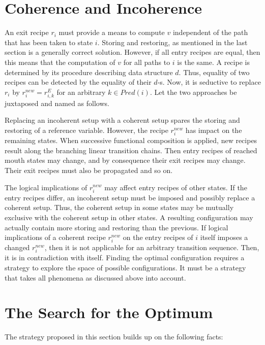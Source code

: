 \documentclass[12pt,a4paper]{scrartcl}
\begin{document}
\section{Coherence and Incoherence}

An exit recipe $r_i$ must provide a means to compute $v$ independent of the
path that has been taken to state $i$. Storing and restoring, as mentioned in
the last section is a generally correct solution. However, if all entry recipes
are equal, then this means that the computation of $v$ for all paths to $i$ is
the same.  A recipe is determined by its procedure describing data structure
$d$. Thus, equality of two recipes can be detected by the equality of their
$d$-s. Now, it is seductive to replace $r_i$ by $r^{new}_i=r^E_{i,k}$ for an
arbitrary $k\in Pred(i)$. Let the two approaches be juxtaposed and named
as follows.

Replacing an incoherent setup with a coherent setup spares the storing and
restoring of a reference variable. However, the recipe $r^{new}_i$ has impact
on the remaining states. When successive functional composition is applied, new
recipes result along the branching linear transition chains.  Then entry
recipes of reached mouth states may change, and by consequence their exit
recipes may change.  Their exit recipes must also be propagated and so on. 

The logical implications of $r^{new}_i$ may affect entry recipes of other
states. If the entry recipes differ, an incoherent setup must be imposed and
possibly replace a coherent setup. Thus, the coherent setup in some states may
be mutually exclusive with the coherent setup in other states. A resulting
configuration may actually contain more storing and restoring than the
previous.  If logical implications of a coherent recipe $r^{new}_i$ on the
entry recipes of $i$ itself imposes a changed $r^{new}_i$, then it is not
applicable for an arbitrary transition sequence. Then, it is in contradiction
with itself.  Finding the optimal configuration requires a strategy to explore
the space of possible configurations. It must be a strategy that takes all
phenomena as discussed above into account.

\section{The Search for the Optimum}

The strategy proposed in this section builds up on the following facts:
\end{document}
